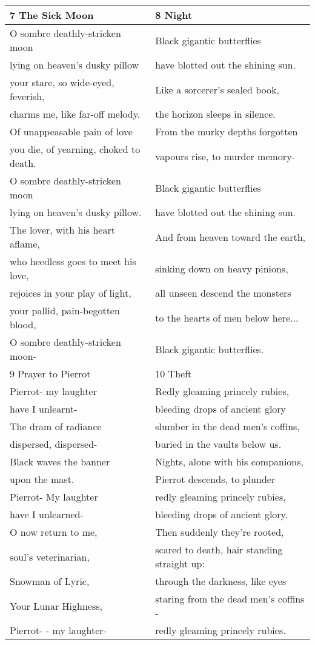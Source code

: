 \newpage
\begin{table}[h!]
\begin{tabular}{p{8.0cm}|p{8.0cm}} \hline

7 The Sick Moon& 8 Night\\\hline
O sombre deathly-stricken moon& Black gigantic butterflies \\ 
lying on heaven's dusky pillow& have blotted out the shining sun. \\
your stare, so wide-eyed, feverish,& Like a sorcerer's sealed book, \\
charms me, like far-off melody.& the horizon sleeps in silence. \\
Of unappeasable pain of love & From the murky depths forgotten \\
you die, of yearning, choked to death.& vapours rise, to murder memory-  \\
O sombre deathly-stricken moon& Black gigantic butterflies \\
lying on heaven's dusky pillow.& have blotted out the shining sun. \\
The lover, with his heart aflame,& And from heaven toward the earth, \\
who heedless goes to meet his love,& sinking down on heavy pinions, \\
rejoices in your play of light,& all unseen descend the monsters \\
your pallid, pain-begotten blood,& to the hearts of men below here... \\
O sombre deathly-stricken moon-& Black gigantic butterflies. \\\hline

9 Prayer to Pierrot & 10 Theft \\\hline
Pierrot- my laughter& Redly gleaming princely rubies, \\
have I unlearnt- & bleeding drops of ancient glory \\
The dram of radiance& slumber in the dead men's coffins, \\
dispersed, dispersed-& buried in the vaults below us. \\
Black waves the banner& Nights, alone with his companions, \\
upon the mast.& Pierrot descends, to plunder \\
Pierrot- My laughter& redly gleaming princely rubies, \\
have I unlearned-& bleeding drops of ancient glory. \\
O now return to me,& Then suddenly they're rooted, \\
soul's veterinarian,& scared to death, hair standing straight up: \\
Snowman of Lyric,& through the darkness, like eyes \\
Your Lunar Highness,& staring from the dead men's coffins -  \\
Pierrot- - my laughter-& redly gleaming princely rubies. \\\hline



\end{tabular}
\end{table}
